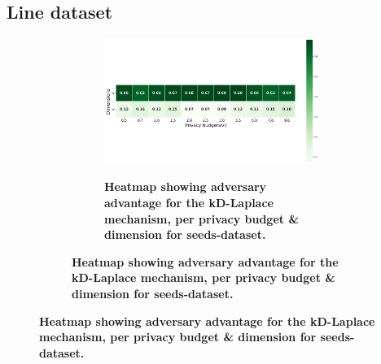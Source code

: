 \newpage
\subsection{Line dataset}
\begin{figure}[H]
  \centering
  \begin{subfigure}[b]{0.85\textwidth}
    \begin{subfigure}[c]{1\textwidth}
      \caption{\textbf{Heatmap showing adversary advantage for the kD-Laplace mechanism, per privacy budget \& dimension for seeds-dataset.}}
      \includegraphics[width=1\textwidth]{Results/kd-laplace/kd-Laplace/line-dataset/shokri_mi_adv.png}
      \label{fig:privacy_line-dataset_adversial_advantage_kd-laplace}
    \end{subfigure}
    \vfill %


\end{subfigure}
\end{figure}
